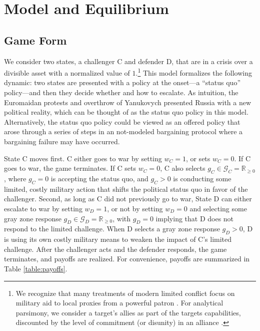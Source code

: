 \documentclass[bibtex, autowc]{apsr_submission}
\begin{document}
\section{Model and Equilibrium} \label{model}
    \subsection{Game Form}
We consider two states, a challenger C and defender D, that are in a crisis over a divisible asset with a normalized value of $1$.\footnote{
We recognize that many treatments of modern limited conflict focus on military aid to local proxies from a powerful patron \citep{plana_proxywarleast_2020}. %
For analytical parsimony, we consider a target's allies as part of the targets capabilities, discounted by the level of commitment (or disunity) in an alliance \citep{sobek_memyselfallies_2013}.} This model formalizes the following dynamic: two states are presented with a policy at the onset---a ``status quo'' policy---and then they decide whether and how to escalate. As intuition, the Euromaidan protests and overthrow of Yanukovych presented Russia with a new political reality, which can be thought of as the status quo policy in this model. Alternatively,  
the status quo policy could be viewed as an offered policy that arose through a series of steps in an not-modeled bargaining protocol where a bargaining failure may have occurred.
    
    State C moves first. C either goes to war by setting $w_{C}=1$, or sets $w_{C}=0$. If C goes to war, the game terminates. If C sets $w_{C}=0$, C also selects $g_{C}\in\mathcal{G}_{C}=\mathbb{R}_{\geq0}$, where $g_{C}=0$ is accepting the status quo, and $g_{C}>0$ is conducting some limited, costly military action that shifts the political status quo in favor of the challenger. Second, as long as C did not previously go to war, State D can either escalate to war by setting $w_{D}=1$, or not by setting $w_{D}=0$ and selecting some gray zone response $g_{D}\in\mathcal{G}_{D}=\mathbb{R}_{\geq0}$, with $g_{D}=0$ implying that D does not respond to the limited challenge. When D selects a gray zone response $g_{D}>0$, D is using its own costly military means to weaken the impact of C's limited challenge. After the challenger acts and the defender responds, the game terminates, and payoffs are realized. For convenience, payoffs are summarized in Table \ref{table:payoffs}.
    
\end{document}
